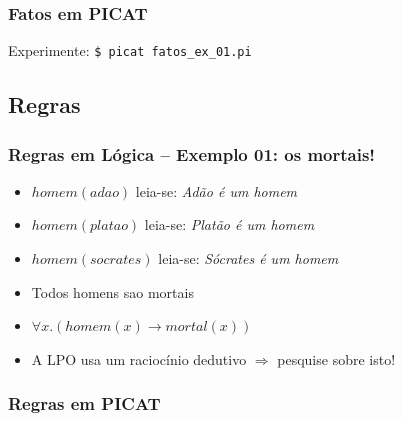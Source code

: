 \documentclass[10pt]{beamer}
\begin{document}
\begin{frame}[allowframebreaks=0.9]
 \frametitle{Fatos em PICAT}



Experimente: \texttt{\$ picat fatos\_ex\_01.pi}
\end{frame}


\subsection{Regras}
\begin{frame}
    \frametitle{Regras  em Lógica -- Exemplo 01: os mortais!}
    \begin{itemize}
    \item $homem(adao)$ \hspace{2cm} leia-se: \textit{Adão é um homem}         
    \item $homem(platao)$ \hspace{2cm} leia-se: \textit{Platão é um homem}
    \item $homem(socrates)$ \hspace{2cm} leia-se: \textit{Sócrates é um homem}

    \item Todos homens sao mortais
    \pause
    \item $\forall x . (homem(x) \rightarrow mortal(x))$
    \item A LPO usa um raciocínio dedutivo $\Rightarrow $ pesquise sobre isto!
    \end{itemize}
\end{frame}

\begin{frame}[allowframebreaks=0.9]
 \frametitle{Regras em PICAT}


\end{frame}

\end{document}
